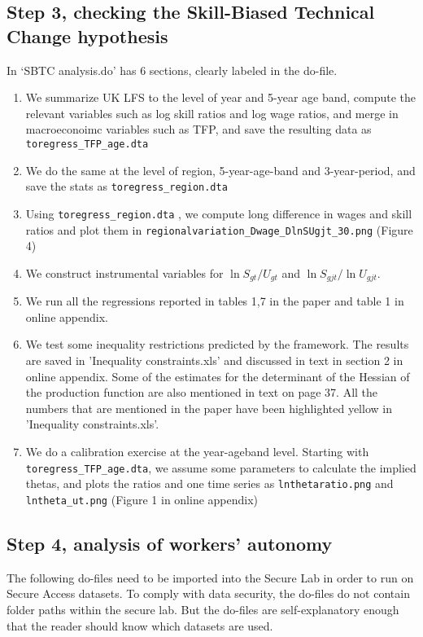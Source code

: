 \documentclass[12pt]{article}
\begin{document}
\subsection{Step 3, checking the Skill-Biased Technical Change hypothesis}
	In ‘SBTC analysis.do’ has 6 sections, clearly labeled in the do-file.
\begin{enumerate}
\item We summarize UK LFS to the level of year and 5-year age band,  compute the relevant variables such as log skill ratios and log wage ratios, and merge in macroeconoimc variables such as TFP, and save the resulting data as  \texttt{toregress\_TFP\_age.dta}
\item We do the same at the level of region, 5-year-age-band and 3-year-period, and save the stats as \texttt{toregress\_region.dta} 
\item Using \texttt{toregress\_region.dta} , we compute long difference in wages and skill ratios and plot them in \texttt{regionalvariation\_Dwage\_DlnSUgjt\_30.png} (Figure 4)
\item We construct instrumental variables for $\ln S_{gt}/U_{gt}$ and $ \ln S_{gjt}/ \ln U_{gjt}$. 
\item We run all the regressions reported in tables 1,7 in the paper and table 1 in online appendix.
\item We test some inequality restrictions predicted by the framework. The results are saved in 'Inequality constraints.xls' and discussed in text in section 2 in online appendix. Some of the estimates for the determinant of the Hessian of the production function are also mentioned in text on page 37. All the numbers that are mentioned in the paper have been highlighted yellow in  'Inequality constraints.xls'.
\item We do a calibration exercise at the year-ageband level. Starting with \texttt{toregress\_TFP\_age.dta}, we assume some parameters to calculate the implied thetas, and plots the ratios and one time series as \texttt{lnthetaratio.png} and \texttt{lntheta\_ut.png} (Figure 1 in online appendix)
\end{enumerate}

\subsection{Step 4, analysis of workers' autonomy}
The following do-files need to be imported into the Secure Lab in order to run on Secure Access datasets. To comply with data security, the do-files do not contain folder paths within the secure lab. But the do-files are self-explanatory enough that the reader should know which datasets are used.
\end{document}
